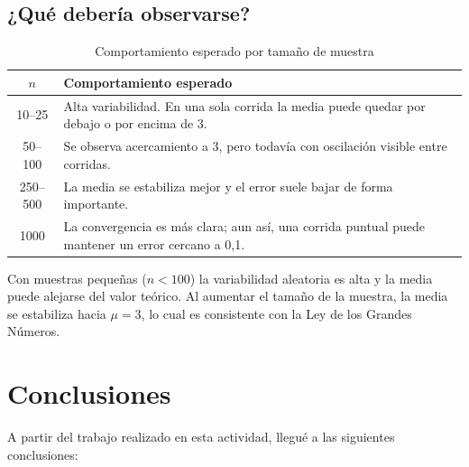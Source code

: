 \documentclass[12pt,a4paper]{article}
\begin{document}
\subsection{¿Qué debería observarse?}

\begin{table}[H]
\centering
\caption{Comportamiento esperado por tamaño de muestra}
\begin{tabular}{cp{11cm}}
\toprule
\textbf{$n$} & \textbf{Comportamiento esperado} \\
\midrule
10--25    & Alta variabilidad. En una sola corrida la media puede quedar por debajo o por encima de 3. \\
50--100   & Se observa acercamiento a 3, pero todavía con oscilación visible entre corridas. \\
250--500  & La media se estabiliza mejor y el error suele bajar de forma importante. \\
1000      & La convergencia es más clara; aun así, una corrida puntual puede mantener un error cercano a 0,1. \\
\bottomrule
\end{tabular}
\end{table}

\begin{notabox}
Con muestras pequeñas ($n < 100$) la variabilidad aleatoria es alta y la media puede alejarse del valor teórico. Al aumentar el tamaño de la muestra, la media se estabiliza hacia $\mu = 3$, lo cual es consistente con la Ley de los Grandes Números.
\end{notabox}

\newpage

\section{Conclusiones}

A partir del trabajo realizado en esta actividad, llegué a las siguientes conclusiones:
\end{document}
